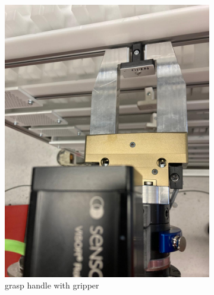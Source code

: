 \begin{figure}[!ht]
    \begin{subfigure}[b]{0.32\textwidth}
        \centering
        \includegraphics[width=\textwidth]{figures/shelf-control/hold-handle.jpeg}
        \caption{grasp handle with gripper}
        \label{subfig:grasp-handle}
    \end{subfigure}\hspace{0.1cm}
    \vspace{1cm}
    \begin{subfigure}[b]{0.32\textwidth}
        \centering

\end{subfigure}
\end{figure}

